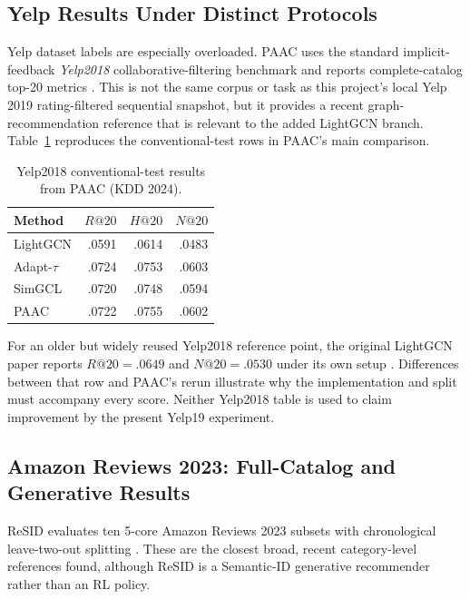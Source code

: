 \subsection{Yelp Results Under Distinct Protocols}

Yelp dataset labels are especially overloaded. PAAC uses the standard
implicit-feedback \emph{Yelp2018} collaborative-filtering benchmark and reports
complete-catalog top-20 metrics \cite{PAAC}. This is not the same corpus or task
as this project's local Yelp 2019 rating-filtered sequential snapshot, but it
provides a recent graph-recommendation reference that is relevant to the added
LightGCN branch. Table~\ref{tab:paac-yelp2018} reproduces the conventional-test
rows in PAAC's main comparison.

\begin{table}[H]
\centering
\caption{Yelp2018 conventional-test results from PAAC (KDD 2024).}
\label{tab:paac-yelp2018}
\begin{tabular}{@{}lrrr@{}}
\toprule
Method & $R@20$ & $H@20$ & $N@20$ \\
\midrule
LightGCN & .0591 & .0614 & .0483 \\
Adapt-$\tau$ & .0724 & .0753 & .0603 \\
SimGCL & .0720 & .0748 & .0594 \\
PAAC & .0722 & .0755 & .0602 \\
\bottomrule
\end{tabular}
\end{table}

For an older but widely reused Yelp2018 reference point, the original
LightGCN paper reports $R@20=.0649$ and $N@20=.0530$ under its own setup
\cite{LIGHTGCN}. Differences between that row and PAAC's rerun illustrate why
the implementation and split must accompany every score. Neither Yelp2018
table is used to claim improvement by the present Yelp19 experiment.

\subsection{Amazon Reviews 2023: Full-Catalog and Generative Results}

ReSID evaluates ten 5-core Amazon Reviews 2023 subsets with chronological
leave-two-out splitting \cite{RESID}. These are the closest broad, recent
category-level references found, although ReSID is a Semantic-ID generative
recommender rather than an RL policy.

